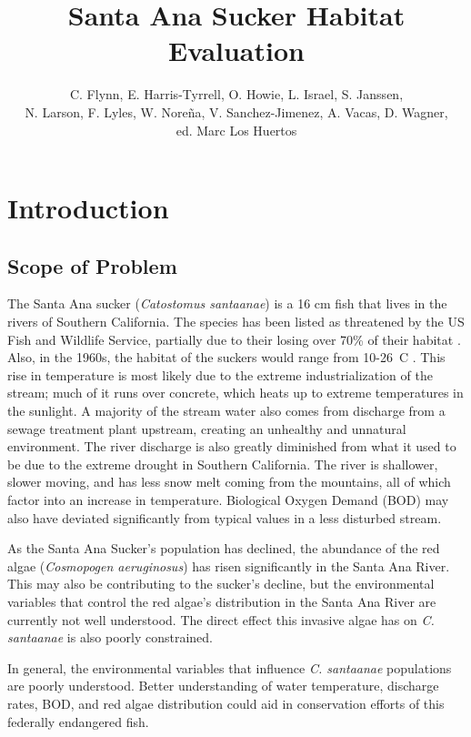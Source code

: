 \documentclass{article}\usepackage[]{graphicx}\usepackage[]{color}
\title{Santa Ana Sucker Habitat Evaluation}
\author{C. Flynn, E. Harris-Tyrrell, O. Howie, L. Israel, S. Janssen, \\N. Larson, F. Lyles, W. Nore\~na, V. Sanchez-Jimenez, A. Vacas, D. Wagner,\\ ed. Marc Los Huertos}
\begin{document}
\maketitle

\newpage
\tableofcontents
\newpage

\section{Introduction}

\subsection{Scope of Problem}

The Santa Ana sucker (\emph{Catostomus santaanae}) is a 16 cm fish that lives in the rivers of Southern California. The species has been listed as threatened by the US Fish and Wildlife Service, partially due to their losing over 70\% of their habitat \citep{obrien2011status, usfishandwildlifeservice14}. Also, in the 1960s, the habitat of the suckers would range from 10-26\textdegree~C \citep{greenfield70}.  This rise in temperature is most likely due to the extreme industrialization of the stream; much of it runs over concrete, which heats up to extreme temperatures in the sunlight.  A majority of the stream water also comes from discharge from a sewage treatment plant upstream, creating an unhealthy and unnatural environment.  The river discharge is also greatly diminished from what it used to be due to the extreme drought in Southern California.  The river is shallower, slower moving, and has less snow melt coming from the mountains, all of which factor into an increase in temperature. Biological Oxygen Demand (BOD) may also have deviated significantly from typical values in a less disturbed stream. 

As the Santa Ana Sucker's population has declined, the abundance of the red algae (\emph{Cosmopogen aeruginosus}) has risen significantly in the Santa Ana River. This may also be contributing to the sucker's decline, but the environmental variables that control the red algae's distribution in the Santa Ana River are currently not well understood. The direct effect this invasive algae has on \emph{C. santaanae} is also poorly constrained. 

In general, the environmental variables that influence \emph{C. santaanae} populations are poorly understood. Better understanding of water temperature, discharge rates, BOD, and red algae distribution could aid in conservation efforts of this federally endangered fish. 
\end{document}
